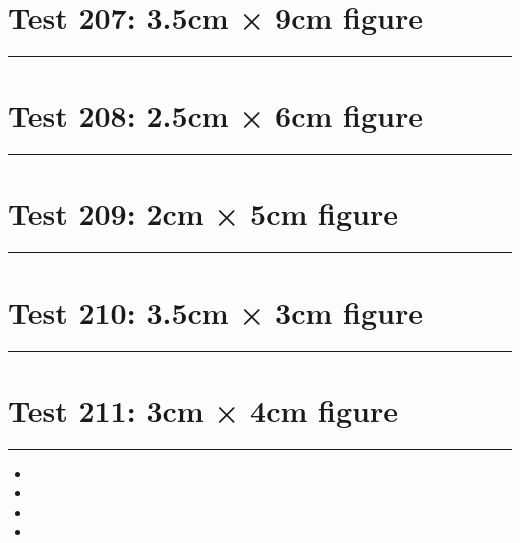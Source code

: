 \documentclass[a4paper,11pt]{article}
\begin{document}
\section*{Test 207: 3.5cm × 9cm figure}
\begin{swarmwrap}%
  \begin{minipage}[t]{3cm}
    \centering
    \rule{\linewidth}{9cm}
  \end{minipage}%
\end{swarmwrap}%
\swarmwrapnext
\lipsum[10]
\lipsum[11]
\lipsum[12]
\lipsum[13]
\lipsum[14]
\section*{Test 208: 2.5cm × 6cm figure}
\begin{swarmwrap}%
  \begin{minipage}[t]{2cm}
    \centering
    \rule{\linewidth}{6cm}
  \end{minipage}%
\end{swarmwrap}%
\swarmwrapnext
\lipsum[118]
\lipsum[119]
\lipsum[120]
\lipsum[121]
\lipsum[122]
\section*{Test 209: 2cm × 5cm figure}
\begin{swarmwrap}%
  \begin{minipage}[t]{2cm}
    \centering
    \rule{\linewidth}{5cm}
  \end{minipage}%
\end{swarmwrap}%
\swarmwrapnext
\lipsum[52]
\lipsum[53]
\lipsum[54]
\lipsum[55]
\lipsum[56]
\section*{Test 210: 3.5cm × 3cm figure}
\begin{swarmwrap}%
  \begin{minipage}[t]{3cm}
    \centering
    \rule{\linewidth}{3cm}
  \end{minipage}%
\end{swarmwrap}%
\swarmwrapnext
\lipsum[40]
\lipsum[41]
\lipsum[42]
\lipsum[43]
\section*{Test 211: 3cm × 4cm figure}
\begin{swarmwrap}%
  \begin{minipage}[t]{3cm}
    \centering
    \rule{\linewidth}{4cm}
  \end{minipage}%
\end{swarmwrap}
\begin{itemize}
  \item \swarmwrapnext\lipsum[16][1-4]
  \item \lipsum[18][1-3]
  \item \lipsum[19][1-3]
  \item \lipsum[20][1-3]
\end{itemize}
\end{document}
